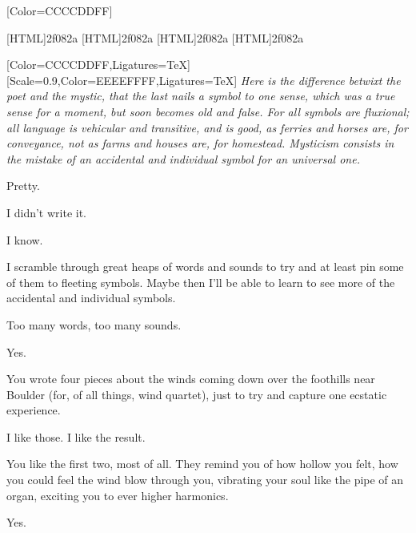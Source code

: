 \renewfontfamily{}[Color=CCCCDDFF]

[HTML]{2f082a}
[HTML]{2f082a}
[HTML]{2f082a}
[HTML]{2f082a}

\begin{paracol}{2}
\begin{rightcolumn*}
  
\end{rightcolumn*}
\begin{leftcolumn}
  [Color=CCCCDDFF,Ligatures=TeX]
  \renewfontfamily{}[Scale=0.9,Color=EEEEFFFF,Ligatures=TeX]
\noindent \emph{Here is the difference betwixt the poet and the mystic, that the last nails a symbol to one sense, which was a true sense for a moment, but soon becomes old and false. For all symbols are fluxional; all language is vehicular and transitive, and is good, as ferries and horses are, for conveyance, not as farms and houses are, for homestead. Mysticism consists in the mistake of an accidental and individual symbol for an universal one.}

\begin{ally}
Pretty.
\end{ally}
\noindent I didn't write it.

\begin{ally}
I know.
\end{ally}
\noindent I scramble through great heaps of words and sounds to try and at least pin some of them to fleeting symbols. Maybe then I'll be able to learn to see more of the accidental and individual symbols.

\begin{ally}
Too many words, too many sounds.
\end{ally}
\noindent Yes.

\begin{ally}
You wrote four pieces about the winds coming down over the foothills near Boulder (for, of all things, wind quartet), just to try and capture one ecstatic experience.
\end{ally}
\noindent I like those. I like the result.

\begin{ally}
You like the first two, most of all. They remind you of how hollow you felt, how you could feel the wind blow through you, vibrating your soul like the pipe of an organ, exciting you to ever higher harmonics.
\end{ally}
\noindent Yes.


\end{leftcolumn}
\end{paracol}
